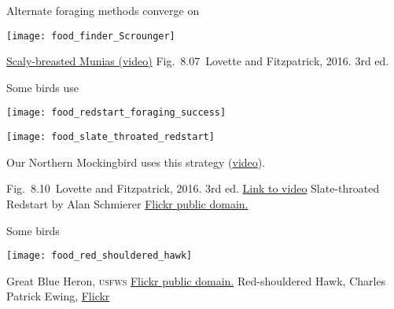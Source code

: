 \documentclass[t]{beamer}
\newcommand{\cornell}[1]{Fig.~#1~Lovette and Fitzpatrick, 2016. 3rd ed.}
\begin{document}
\begin{frame}[t,plain]{Alternate foraging methods converge on }

	\centering 
	\texttt{[image: food\_finder\_Scrounger]}

	\vfilll
	
	\tiny \href{https://www.youtube.com/watch?v=wu-1e9rvdh0}{Scaly-breasted Munias (video)} \hfill{\cornell{8.07}}
\end{frame}

\begin{frame}[t,plain]{Some birds use }

	\begin{multicols}{2}
	\texttt{[image: food\_redstart\_foraging\_success]}

	\columnbreak

	\texttt{[image: food\_slate\_throated\_redstart]}
	\end{multicols}

	\hangpara Our Northern Mockingbird uses this strategy (\href{https://www.youtube.com/watch?v=GF5xBvmeOjo}{video}).

	\vfilll
	
	\tiny \cornell{8.10} \hfill \href{https://www.youtube.com/watch?v=9Fp-tOfpJlg}{Link to video} \hfill Slate-throated Redstart by Alan Schmierer \href{https://www.flickr.com/photos/8101022@N05/14107576517}{Flickr public domain.} 
\end{frame}

\begin{frame}[t,plain]{Some birds }

	\begin{multicols}{2}

	\columnbreak

	\texttt{[image: food\_red\_shouldered\_hawk]}
	\end{multicols}


	\vfilll
	
	\tiny Great Blue Heron, \textsc{usfws} \href{https://www.flickr.com/photos/8101022@N05/14107576517}{Flickr public domain.} \hfill Red-shouldered Hawk, Charles Patrick Ewing,  \href{https://www.flickr.com/photos/132033298@N04/31366747854}{Flickr} 
\end{frame}
\end{document}
